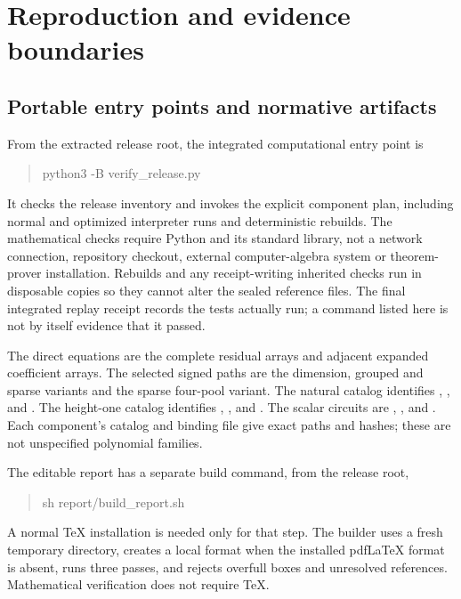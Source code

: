 \section{Reproduction and evidence boundaries}
\label{sec:verification}
\subsection{Portable entry points and normative artifacts}
From the extracted release root, the integrated computational entry point is
\begin{quote}\ttfamily
python3 -B verify\_release.py
\end{quote}
It checks the release inventory and invokes the explicit component plan,
including normal and optimized interpreter runs and deterministic rebuilds.
The mathematical checks require Python and its standard library, not a
network connection, repository checkout, external computer-algebra system
or theorem-prover installation. Rebuilds and any receipt-writing inherited
checks run in disposable copies so they cannot alter the sealed reference
files. The final integrated replay receipt records the tests actually run;
a command listed here is not by itself evidence that it passed.

The direct equations are the complete residual arrays and adjacent expanded
coefficient arrays. The selected signed paths are the dimension, grouped
and sparse  variants and the sparse
 four-pool variant. The natural catalog identifies
, ,  and
. The height-one catalog identifies
, ,  and
. The scalar circuits are
,
,
 and
.
Each component's catalog and binding file give exact paths and hashes;
these are not unspecified polynomial families.

The editable report has a separate build command, from the release root,
\begin{quote}\ttfamily
sh report/build\_report.sh
\end{quote}
A normal TeX installation is needed only for that step. The builder uses a
fresh temporary directory, creates a local format when the installed
pdfLaTeX format is absent, runs three passes, and rejects overfull boxes and
unresolved references. Mathematical verification does not require TeX.

